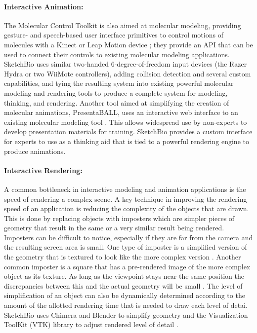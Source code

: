 \documentclass[twocolumn]{bmcart}%
\begin{document}
\paragraph*{Interactive Animation:}
The Molecular Control Toolkit \cite{sabirmolecular} is also aimed at molecular modeling, providing gesture- and speech-based user interface primitives to control motions of molecules with a Kinect or Leap Motion device \cite{sabirmolecular}; they provide an API that can be used to connect their controls to existing molecular modeling applications.
SketchBio uses similar two-handed 6-degree-of-freedom input devices (the Razer Hydra or two WiiMote controllers), adding collision detection and several custom capabilities, and tying the resulting system into existing powerful molecular modeling and rendering tools to produce a complete system for modeling, thinking, and rendering.
Another tool aimed at simplifying the creation of molecular animations, PresentaBALL\cite{nickelspresentaball}, uses an interactive web interface to an existing molecular modeling tool \cite{nickelspresentaball}.
This allows widespread use by non-experts to develop presentation materials for training.  SketchBio provides a custom interface for experts to use as a thinking aid that is tied to a powerful rendering engine to produce animations.

\paragraph*{Interactive Rendering:}
A common bottleneck in interactive modeling and animation applications is the speed of rendering a complex scene.
A key technique in improving the rendering speed of an application is reducing the complexity of the objects that are drawn.
This is done by replacing objects with imposters which are simpler pieces of geometry that result in the same or a very similar result being rendered.
Imposters can be difficult to notice, especially if they are far from the camera and the resulting screen area is small.
One type of imposter is a simplified version of the geometry that is textured to look like the more complex version \cite{decoret2003billboard,erikson1998simplification,cohen1998appearance}.
Another common imposter is a square that has a pre-rendered image of the more complex object as its texture.  As long as the viewpoint stays near the same position the discrepancies between this and the actual geometry will be small \cite{aliaga1996visualization,maciel1995visual}.
The level of simplification of an object can also be dynamically determined according to the amount of the allotted rendering time that is needed to draw each level of detai.  SketchBio uses Chimera and Blender to simplify geometry and the Visualization ToolKit (VTK) library to adjust rendered level of detail \cite{VTKbook}.
\end{document}
